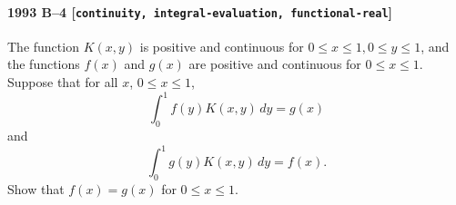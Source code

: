 \paragraph{1993 B--4 \textnormal{[\texttt{continuity, integral-evaluation, functional-real}]}}
The function $K(x,y)$ is positive and continuous for $0 \leq x \leq 1, 0
\leq y \leq 1$, and the functions $f(x)$ and $g(x)$ are positive and
continuous for $0 \leq x \leq 1$. Suppose that for all $x$, $0 \leq x \leq 1$,
\[
\int_0^1 f(y)K(x,y)\,dy = g(x)
\]
and
\[
\int_0^1 g(y)K(x,y)\,dy = f(x).
\]
Show that $f(x) = g(x)$ for $0 \leq x \leq 1$.
